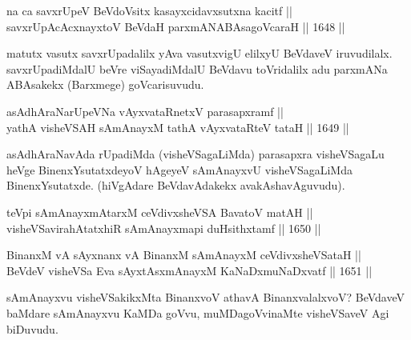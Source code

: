 \begin{shl}
na ca savxrUpeV BeVdoV\s sitx kasayxcidavxsutxna kacitf || \\
savxrUpAcAcxnayxtoV BeVdaH parxmANABAsagoVcaraH \hfill || 1648 ||  
\end{shl}

\begin{artha}
matutx vasutx savxrUpadalilx yAva vasutxvigU elilxyU BeVdaveV iruvudilalx. savxrUpadiMdalU beVre viSayadiMdalU BeVdavu toVridalilx adu parxmANa ABAsakekx (Barxmege) goVcarisuvudu.
\end{artha}


\begin{shl}
asAdhAraNarUpeVNa vAyxvataRnetxV parasapxramf || \\
yathA visheVSAH sAmAnayxM tathA vAyxvataRteV tataH \hfill || 1649 ||  
\end{shl}

\begin{artha}
asAdhAraNavAda rUpadiMda (visheVSagaLiMda) parasapxra visheVSagaLu heVge BinenxYsutatxdeyoV hAgeyeV sAmAnayxvU visheVSagaLiMda BinenxYsutatxde. (hiVgAdare BeVdavAdakekx avakAshavAguvudu).
\end{artha}

\begin{shl}
teV\s pi sAmAnayxmAtarxM ceVdivxsheVSA BavatoV matAH || \\
visheVSavirahAtatxhiR sAmAnayxmapi duHsithxtamf \hfill || 1650 ||  
\end{shl}


\begin{shl}
BinanxM vA sAyxnanx vA BinanxM sAmAnayxM ceVdivxsheVSataH ||  \\
BeVdeV visheVSa Eva sAyxtAsxmAnayxM KaNaDxmuNaDxvatf \hfill || 1651 ||  
\end{shl}

\begin{artha}
sAmAnayxvu visheVSakikxMta BinanxvoV athavA BinanxvalalxvoV? BeVdaveV baMdare sAmAnayxvu KaMDa goVvu, muMDagoVvinaMte visheVSaveV Agi biDuvudu.
\end{artha}


